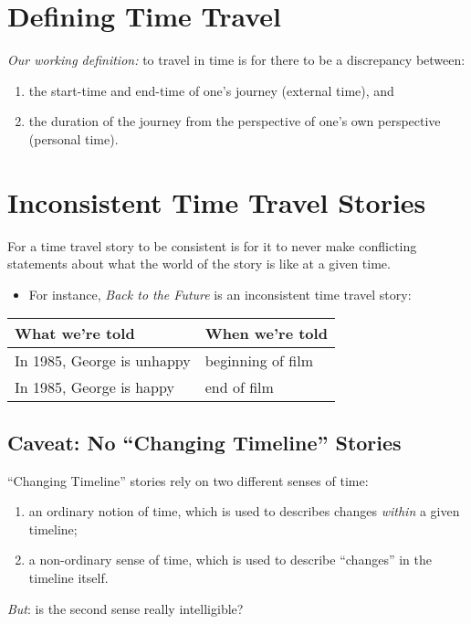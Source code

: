 \documentclass[12pt]{extarticle}
\begin{document}

\section{Defining Time Travel}

\emph{Our working definition:} to travel in time is for there to be a discrepancy between: 

\begin{enumerate}
\item the start-time and end-time of one's journey (external time), and

\item the duration of the journey from the perspective of one's own perspective (personal time).

\end{enumerate}

\section{Inconsistent Time Travel Stories}

For a time travel story to be consistent is for it to never make conflicting statements about what the world of the story is like at a given time.

\begin{itemize}
\item For instance, \emph{Back to the Future} is  an inconsistent time travel story:

\end{itemize}
 \begin{center}
    \begin{tabular}{l|l}
      \textbf{What we're told} & \textbf{When we're told} \\
      \hline
      In 1985, George is unhappy & beginning of film\\
      In 1985, George is happy & end of film\\
    \end{tabular}
  \end{center}

\subsection{Caveat: No ``Changing Timeline'' Stories}

``Changing Timeline'' stories rely on two different senses of time:


\begin{enumerate}

\item an ordinary notion of time, which is used to describes changes \emph{within} a given timeline;
\item a non-ordinary sense of time, which is used to describe ``changes'' in the timeline itself.

\end{enumerate}
\emph{But}: is the second sense really intelligible?
\end{document}
